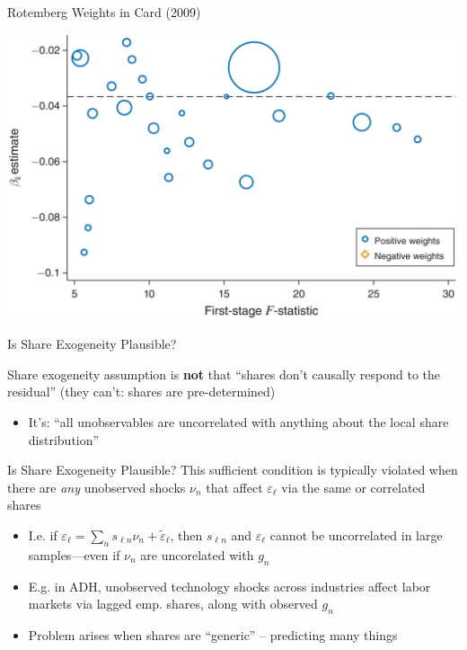 \documentclass[t]{beamer}
\begin{document}
\begin{frame}{Rotemberg Weights in Card (2009)}
\vspace{-0.5cm}
\begin{center}
\includegraphics[height=0.8\textheight]{lecture_includes/card_weights.png}
\end{center}
\end{frame}

\begin{frame}{Is Share Exogeneity Plausible?}

Share exogeneity assumption is \textbf{not} that ``shares don't causally respond to the residual'' (they can't: shares are pre-determined)

\begin{itemize}
	\item It's: ``all unobservables are uncorrelated with anything about the local share distribution''
\end{itemize}

\end{frame}

\begin{frame}{Is Share Exogeneity Plausible?}
This sufficient condition is typically violated when there are \emph{any} unobserved shocks $\nu_n$ that affect $\varepsilon_\ell$ via the same or correlated shares
\smallskip
	\begin{itemize}
	\item %
	I.e. if $\varepsilon_\ell=\sum_n s_{\ell n}\nu_n+\tilde{\varepsilon}_\ell$, then $s_{\ell n}$ and $\varepsilon_\ell$ cannot be uncorrelated in large samples---even if $\nu_n$ are uncorelated with $g_n$\smallskip
	\item E.g. in ADH, unobserved technology shocks across industries affect labor markets via lagged emp. shares, along with observed $g_n$\smallskip
	\item Problem arises when shares are ``generic'' -- predicting many things
	\end{itemize}\bigskip
\end{frame}
\end{document}
